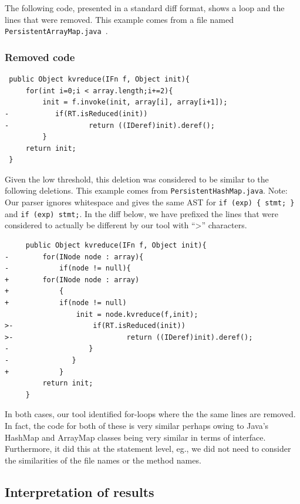 The following code, presented in a standard diff format, shows a loop and the
lines that were removed. This example comes from a file named {\tt
PersistentArrayMap.java }.

\subsubsection{Removed code}
\begin{verbatim}
 public Object kvreduce(IFn f, Object init){
     for(int i=0;i < array.length;i+=2){
         init = f.invoke(init, array[i], array[i+1]);
-           if(RT.isReduced(init))
-                   return ((IDeref)init).deref();
         }
     return init;
 }
\end{verbatim}

Given the low threshold, this deletion was considered to be similar to the
following deletions. This example comes from {\tt PersistentHashMap.java}.
Note: Our parser ignores whitespace and gives the same AST for \verb|if (exp) { stmt; }|
and \verb|if (exp) stmt;|. In the diff below, we have prefixed the
lines that were considered to actually be different by our tool with ``>''
characters.

\begin{verbatim}
     public Object kvreduce(IFn f, Object init){
-        for(INode node : array){
-            if(node != null){
+        for(INode node : array)
+            {
+            if(node != null)
                 init = node.kvreduce(f,init);
>-                   if(RT.isReduced(init))
>-                           return ((IDeref)init).deref();
-                   }
-               }
+            }
         return init;
     }
\end{verbatim}

In both cases, our tool identified for-loops where the the same lines are
removed. In fact, the code for both of these is very similar perhaps owing to
Java's HashMap and ArrayMap classes being very similar in terms of interface.
Furthermore, it did this at the statement level, eg., we did not need to
consider the similarities of the file names or the method names.



\subsection{Interpretation of results}

